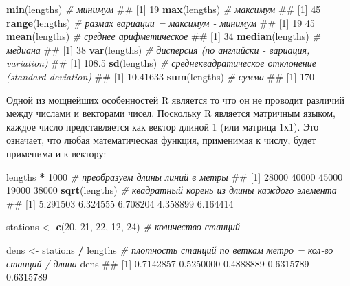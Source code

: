 \documentclass[]{book}
\newenvironment{Shaded}{\begin{snugshade}}{\end{snugshade}}
\newcommand{\KeywordTok}[1]{\textcolor[rgb]{0.13,0.29,0.53}{\textbf{#1}}}
\newcommand{\DecValTok}[1]{\textcolor[rgb]{0.00,0.00,0.81}{#1}}
\newcommand{\StringTok}[1]{\textcolor[rgb]{0.31,0.60,0.02}{#1}}
\newcommand{\CommentTok}[1]{\textcolor[rgb]{0.56,0.35,0.01}{\textit{#1}}}
\newcommand{\OperatorTok}[1]{\textcolor[rgb]{0.81,0.36,0.00}{\textbf{#1}}}
\newcommand{\NormalTok}[1]{#1}
\begin{document}
\begin{Shaded}
\begin{Highlighting}[]
\KeywordTok{min}\NormalTok{(lengths) }\CommentTok{# минимум}
\NormalTok{## [1] 19}
\KeywordTok{max}\NormalTok{(lengths) }\CommentTok{# максимум}
\NormalTok{## [1] 45}
\KeywordTok{range}\NormalTok{(lengths) }\CommentTok{# размах вариации = максимум - минимум}
\NormalTok{## [1] 19 45}
\KeywordTok{mean}\NormalTok{(lengths) }\CommentTok{# среднее арифметическое}
\NormalTok{## [1] 34}
\KeywordTok{median}\NormalTok{(lengths) }\CommentTok{# медиана}
\NormalTok{## [1] 38}
\KeywordTok{var}\NormalTok{(lengths) }\CommentTok{# дисперсия (по английски - вариация, variation)}
\NormalTok{## [1] 108.5}
\KeywordTok{sd}\NormalTok{(lengths) }\CommentTok{# среднеквадратическое отклонение (standard deviation)}
\NormalTok{## [1] 10.41633}
\KeywordTok{sum}\NormalTok{(lengths) }\CommentTok{# сумма}
\NormalTok{## [1] 170}
\end{Highlighting}
\end{Shaded}

Одной из мощнейших особенностей R является то что он не проводит
различий между числами и векторами чисел. Поскольку R является матричным
языком, каждое число представляется как вектор длиной 1 (или матрица
\(1х1\)). Это означает, что любая математическая функция, применимая к
числу, будет применима и к вектору:

\begin{Shaded}
\begin{Highlighting}[]
\NormalTok{lengths }\OperatorTok{*}\StringTok{ }\DecValTok{1000} \CommentTok{# преобразуем длины линий в метры}
\NormalTok{## [1] 28000 40000 45000 19000 38000}
\KeywordTok{sqrt}\NormalTok{(lengths) }\CommentTok{# квадратный корень из длины каждого элемента}
\NormalTok{## [1] 5.291503 6.324555 6.708204 4.358899 6.164414}

\NormalTok{stations <-}\StringTok{ }\KeywordTok{c}\NormalTok{(}\DecValTok{20}\NormalTok{, }\DecValTok{21}\NormalTok{, }\DecValTok{22}\NormalTok{, }\DecValTok{12}\NormalTok{, }\DecValTok{24}\NormalTok{) }\CommentTok{# количество станций}

\NormalTok{dens <-}\StringTok{ }\NormalTok{stations }\OperatorTok{/}\StringTok{ }\NormalTok{lengths }\CommentTok{# плотность станций по веткам метро = кол-во станций / длина }
\NormalTok{dens}
\NormalTok{## [1] 0.7142857 0.5250000 0.4888889 0.6315789 0.6315789}
\end{Highlighting}
\end{Shaded}
\end{document}
